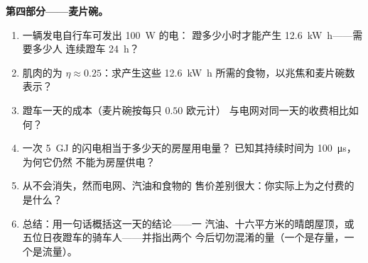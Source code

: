 \begin{problem}
\medskip
\noindent\textbf{第四部分——麦片碗。}
\begin{enumerate}[resume]
  \item 一辆发电自行车可发出 \qty{100}{W} 的电：
        蹬多少小时才能产生 \qty{12.6}{kW.h}——需要多少人
        连续蹬车 \qty{24}{h}？
  \item 肌肉的为 $\eta \approx 0.25$：求产生这些
        \qty{12.6}{kW.h} 所需的食物，以兆焦和麦片碗数表示？
  \item 蹬车一天的成本（麦片碗按每只 $0.50$ 欧元计）
        与电网对同一天的收费相比如何？
  \item 一次 \qty{5}{GJ} 的闪电相当于多少天的房屋用电量？
        已知其持续时间为 \qty{100}{\micro s}，为何它仍然
        不能为房屋供电？
  \item {}从不会消失，然而电网、汽油和食物的
        售价差别很大：你实际上为之付费的是什么？
  \item 总结：用一句话概括这一天的结论——一
        汽油、十六平方米的晴朗屋顶，或
        五位日夜蹬车的骑车人——并指出两个
        今后切勿混淆的量（一个是存量，一个是流量）。
\end{enumerate}
\end{problem}
